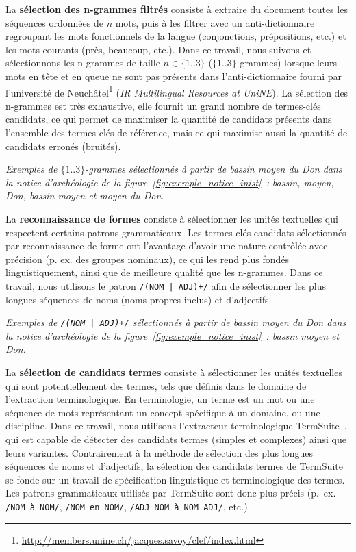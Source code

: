     La \textbf{sélection des n-grammes filtrés} consiste à extraire du document
    toutes les séquences ordonnées de $n$ mots, puis à les filtrer avec un
    anti-dictionnaire regroupant les mots fonctionnels de la langue
    (conjonctions, prépositions, etc.) et les mots courants (\og{}près\fg{},
    \og{}beaucoup\fg{}, etc.). Dans ce travail, nous suivons
     et sélectionnons les n-grammes de taille $n \in
    \{1..3\}$ ($\{1..3\}$-grammes) lorsque leurs mots en tête et en queue ne
    sont pas présents dans l'anti-dictionnaire fourni par l'université de
    Neuchâtel\footnote{\url{http://members.unine.ch/jacques.savoy/clef/index.html}}
    (\textit{IR Multilingual Resources at UniNE}). La sélection des n-grammes
    est très exhaustive, elle fournit un grand nombre de termes-clés candidats,
    ce qui permet de maximiser la quantité de candidats présents dans l'ensemble
    des termes-clés de référence, mais ce qui maximise aussi la quantité de
    candidats erronés (bruités).
    
    \textit{Exemples de $\{1..3\}$-grammes sélectionnés à partir de \og{}bassin
    moyen du Don\fg{} dans la notice d'archéologie de la
    figure~\ref{fig:exemple_notice_inist}~: \og{}bassin\fg{}, \og{}moyen\fg{},
    \og{}Don\fg{}, \og{}bassin moyen\fg{} et \og{}moyen du Don\fg{}}.

    La \textbf{reconnaissance de formes} consiste à sélectionner les unités
    textuelles qui respectent certains patrons grammaticaux. Les termes-clés
    candidats sélectionnés par reconnaissance de forme ont l'avantage d'avoir
    une nature contrôlée avec précision (p. ex. des groupes nominaux), ce qui
    les rend plus fondés linguistiquement, ainsi que de meilleure qualité que
    les n-grammes. Dans ce travail, nous utilisons le patron
    \texttt{/(NOM | ADJ)+/} afin de sélectionner les plus longues séquences de
    noms (noms propres inclus) et d'adjectifs~\cite{hassan2010conundrums}.
    
    \textit{Exemples de \texttt{/(NOM | ADJ)+/} sélectionnés à partir de
    \og{}bassin moyen du Don\fg{} dans la notice d'archéologie de la
    figure~\ref{fig:exemple_notice_inist}~: \og{}bassin moyen\fg{} et
    \og{}Don\fg{}.}

    La \textbf{sélection de candidats termes} consiste à sélectionner les unités
    textuelles qui sont potentiellement des termes, tels que définis dans le
    domaine de l'extraction terminologique. En terminologie, un terme est un mot
    ou une séquence de mots représentant un concept spécifique à un domaine, ou
    une discipline. Dans ce travail, nous utilisons l'extracteur terminologique
    TermSuite~\cite{rocheteau2011termsuite}, qui est capable de détecter des
    candidats termes (simples et complexes) ainsi que leurs variantes.
    Contrairement à la méthode de sélection des plus longues séquences de noms
    et d'adjectifs, la sélection des candidats termes de TermSuite se fonde sur
    un travail de spécification linguistique et terminologique des termes. Les
    patrons grammaticaux utilisés par TermSuite sont donc plus précis (p.~ex.
    \texttt{/NOM à NOM/}, \texttt{/NOM en NOM/}, \texttt{/ADJ NOM à NOM ADJ/},
    etc.).
    
